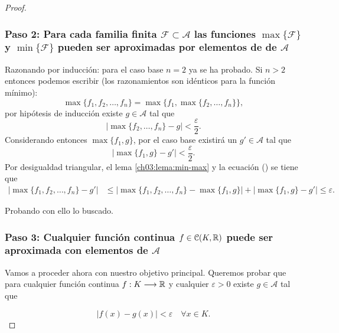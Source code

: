 \begin{proof}
    \subsubsection*{Paso 2: Para cada familia finita $\mathcal{F} \subset \mathcal{A}$ las funciones $\max\{\mathcal{F}\}$ y $\min\{\mathcal{F}\}$ pueden ser aproximadas por elementos de
    de $\mathcal{A}$}
    \label{ch03:weiertrass-paso-2}
     Razonando por inducción: para el caso base $n=2$ ya se ha probado. 
    Si $n >2$ entonces podemos escribir (los razonamientos son idénticos para la función mínimo):
    \begin{equation}
        \max\{f_1, f_2, \ldots, f_n\}
        =
        \max\{f_1, \max\{f_2, \ldots, f_n\}\},
    \end{equation}
    por hipótesis de inducción existe
    $g \in \mathcal{A}$ tal que 
    \begin{equation}
        |\max\{f_2, \ldots, f_n\} - g|
        < 
        \frac{\varepsilon}{2}.
    \end{equation}
    Considerando entonces 
    $\max\{f_1,g\}$, por el caso base existirá 
    un $g' \in \mathcal{A}$ tal que
    \begin{equation}\label{cota:max-g}
        |\max\{f_1,g\} - g'| 
        < \frac{\varepsilon}{2}.
    \end{equation} 
    Por desigualdad triangular, el lema \ref{ch03:lema:min-max} y la ecuación () se tiene que 
    \begin{align}
        |\max\{f_1, f_2, \ldots, f_n\} 
        -
        g'
        | 
        &\leq
        |\max\{f_1, f_2, \ldots, f_n\} 
        -
        \max\{f_1,g\}
        |
        + 
        |
        \max\{f_1,g\}-
        g'
        | 
        \leq
        \varepsilon.
    \end{align}

    Probando con ello lo buscado.
    
    \subsubsection*{Paso 3: Cualquier función continua $f \in \mathcal{C}(K, \mathbb{R})$ puede ser aproximada con elementos
    de $\mathcal{A}$}
    Vamos a proceder ahora con nuestro objetivo 
    principal. 
    Queremos probar que para cualquier función continua $f: K \longrightarrow \mathbb{R}$ y cualquier $\varepsilon > 0$ existe $g \in \mathcal{A}$ tal que 

    \begin{equation}
        |f(x) - g(x)| < \varepsilon \quad \forall  x \in K. 
    \end{equation}


\end{proof}
